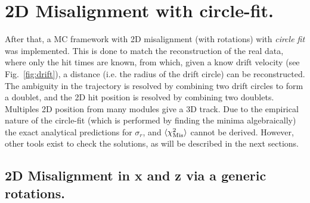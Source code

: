 \documentclass[a4paper,11pt]{article}
\begin{document}
\section{2D Misalignment with circle-fit.}
\vspace{-0.2cm}
After that, a MC framework with 2D misalignment (with rotations) with \textit{circle fit} was implemented. This is done to match the reconstruction of the real data, where only the hit times are known, from which, given a know drift velocity (see Fig.~\ref{fig:drift}), a distance (i.e. the radius of the drift circle) can be reconstructed. The ambiguity in the trajectory is resolved by combining two drift circles to form a doublet, and the 2D hit position is resolved by combining two doublets. Multiples 2D position from many modules give a 3D track. Due to the empirical nature of the circle-fit (which is performed by finding the minima algebraically) the exact analytical predictions for $\sigma_r$, and $\langle \chi^2_{\rm{Mis}} \rangle$ cannot be derived. However, other tools exist to check the solutions, as will be described in the next sections.

\subsection{2D Misalignment in x and z via a generic rotations.}
\end{document}
